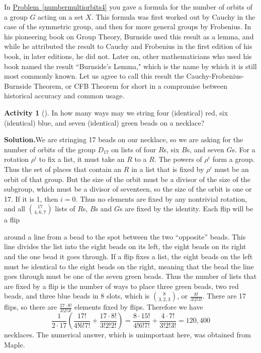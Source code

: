 \documentclass[10pt,]{book}
\theoremstyle{plain}
\theoremstyle{definition}
\newtheorem{activity}[project]{Activity}
\numberwithin{equation}{chapter}
\begin{document}
In \hyperref[numbermultiorbits4]{Problem~\ref{numbermultiorbits4}} you gave a formula for the number of orbits of a group \(G\) acting on a set \(X\). This formula was first worked out by Cauchy in the case of the symmetric group, and then for more general groups by Frobenius. In his pioneering book on Group Theory, Burnside used this result as a lemma, and while he attributed the result to Cauchy and Frobenius in the first edition of his book, in later editions, he did not. Later on, other mathematicians who used his book named the result ``Burnside's Lemma," which is the name by which it is still most commonly known. Let us agree to call this result the Cauchy-Frobenius-Burnside Theorem, or CFB Theorem for short in a compromise between historical accuracy and common usage.%
\begin{activity}[]\label{activity-310}
In how many ways may we string four (identical) red, six (identical) blue, and seven (identical) green beads on a necklace?%
\par\medskip\noindent%
\textbf{Solution.}\quad We are stringing 17 beads on our necklace, so we are asking for the number of orbits of the group \(D_{17}\) on lists of four \(R\)s, six \(B\)s, and seven \(G\)s. For a rotation \(\rho^i\) to fix a list, it must take an \(R\) to a \(R\). The powers of \(\rho^i\) form a group. Thus the set of places that contain an \(R\) in a list that is fixed by \(\rho^i\) must be an orbit of that group. But the size of the orbit must be a divisor of the size of the subgroup, which must be a divisor of seventeen, so the size of the orbit is one or 17. If it is 1, then \(i=0\). Thus no elements are fixed by any nontrivial rotation, and all \(\binom{17}{4,6,7}\) lists of \(R\)s, \(B\)s and \(G\)s are fixed by the identity. Each flip will be a flip \strut around a line from a bead to the spot between the two ``opposite'' beads. This line divides the list into the eight beads on its left, the eight beads on its right and the one bead it goes through. If a flip fixes a list, the eight beads on the left must be identical to the eight beads on the right, meaning that the bead the line goes through must be one of the seven green beads. Thus the number of lists that are fixed by a flip is the number of ways to place three green beads, two red beads, and three blue beads in 8 slots, which is \(\binom{8}{3,2,3}\), or \(\frac{8!}{3!2!3!}\). There are 17 flips, so there are \(\frac{17\cdot8!}{3!2!3!}\) elements fixed by flips. Therefore we have%
\begin{equation*}
\frac{1}{2\cdot 17}\left(\frac{17!}{4!6!7!} + \frac{17\cdot8!}{3!2!2!}\right) =
\frac{8\cdot15!}{4!6!7!} + \frac{4\cdot7!}{3!2!3!}= 120,400
\end{equation*}
necklaces. The numerical answer, which is unimportant here, was obtained from Maple.%
\end{activity}
\end{document}
